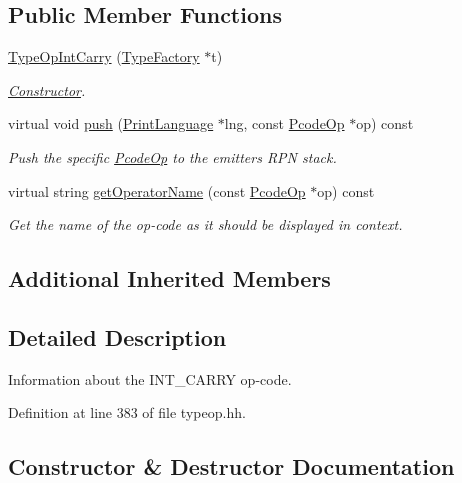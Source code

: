 \subsection*{Public Member Functions}
\begin{DoxyCompactItemize}
\item 
\mbox{\hyperlink{class_type_op_int_carry_ad7aa187f0420339a82b50a50082379d5}{Type\+Op\+Int\+Carry}} (\mbox{\hyperlink{class_type_factory}{Type\+Factory}} $\ast$t)
\begin{DoxyCompactList}\small\item\em \mbox{\hyperlink{class_constructor}{Constructor}}. \end{DoxyCompactList}\item 
virtual void \mbox{\hyperlink{class_type_op_int_carry_adf5a7bd70606130b2bdd1d38d9019edc}{push}} (\mbox{\hyperlink{class_print_language}{Print\+Language}} $\ast$lng, const \mbox{\hyperlink{class_pcode_op}{Pcode\+Op}} $\ast$op) const
\begin{DoxyCompactList}\small\item\em Push the specific \mbox{\hyperlink{class_pcode_op}{Pcode\+Op}} to the emitter\textquotesingle{}s R\+PN stack. \end{DoxyCompactList}\item 
virtual string \mbox{\hyperlink{class_type_op_int_carry_a36e1a02f54952da1c1be18fa5b71d6e7}{get\+Operator\+Name}} (const \mbox{\hyperlink{class_pcode_op}{Pcode\+Op}} $\ast$op) const
\begin{DoxyCompactList}\small\item\em Get the name of the op-\/code as it should be displayed in context. \end{DoxyCompactList}\end{DoxyCompactItemize}
\subsection*{Additional Inherited Members}


\subsection{Detailed Description}
Information about the I\+N\+T\+\_\+\+C\+A\+R\+RY op-\/code. 

Definition at line 383 of file typeop.\+hh.



\subsection{Constructor \& Destructor Documentation}
\mbox{\label{class_type_op_int_carry_ad7aa187f0420339a82b50a50082379d5}} 
